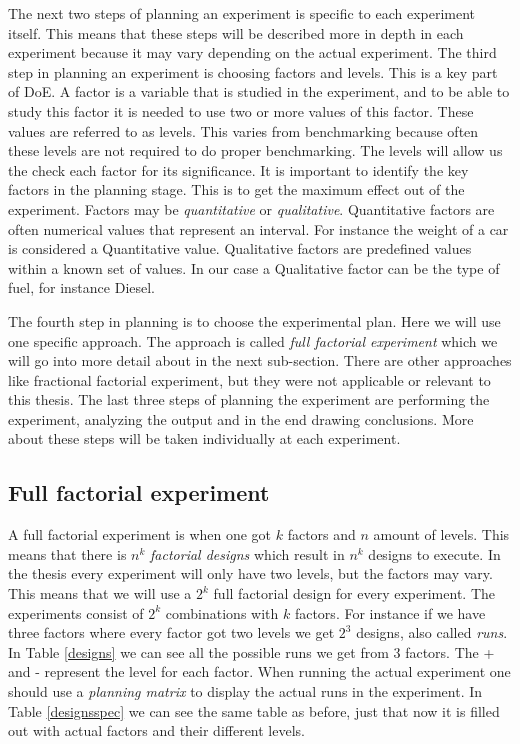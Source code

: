 \documentclass{llncs}
\begin{document}
The next two steps of planning an experiment is specific to each
experiment itself. This means that these steps will be described more
in depth in each experiment because it may vary depending on the
actual experiment.  The third step in planning an experiment is
choosing factors and levels. This is a key part of DoE. A factor is a
variable that is studied in the experiment, and to be able to study
this factor it is needed to use two or more values of this
factor. These values are referred to as levels.  This varies from
benchmarking because often these levels are not required to do proper
benchmarking.  The levels will allow us the check each factor for its
significance. It is important to identify the key factors in the
planning stage. This is to get the maximum effect out of the
experiment.  Factors may be \textit{quantitative} or
\textit{qualitative}. Quantitative factors are often numerical values
that represent an interval. For instance the weight of a car is
considered a Quantitative value. Qualitative factors are predefined
values within a known set of values.  In our case a Qualitative factor
can be the type of fuel, for instance Diesel.

The fourth step in planning is to choose the experimental plan. Here
we will use one specific approach. The approach is called \textit{full
  factorial experiment} which we will go into more detail about in the
next sub-section. There are other approaches like fractional factorial
experiment, but they were not applicable or relevant to this thesis.
The last three steps of planning the experiment are performing the
experiment, analyzing the output and in the end drawing
conclusions. More about these steps will be taken individually at each
experiment.~\cite{PlanExp}


\subsection{Full factorial experiment}
A full factorial experiment is when one got $k$ factors and $n$ amount
of levels. This means that there is $n^k$ \textit{factorial designs}
which result in $n^k$ designs to execute.  In the thesis every
experiment will only have two levels, but the factors may vary. This
means that we will use a $2^k$ full factorial design for every
experiment. The experiments consist of $2^k$ combinations with $k$
factors. For instance if we have three factors where every factor got
two levels we get $2^3$ designs, also called \textit{runs}. In Table
\ref{designs} we can see all the possible runs we get from 3
factors. The + and - represent the level for each factor.  When
running the actual experiment one should use a \textit{planning
  matrix} to display the actual runs in the experiment. In Table
\ref{designsspec} we can see the same table as before, just that now
it is filled out with actual factors and their different levels.
\end{document}
